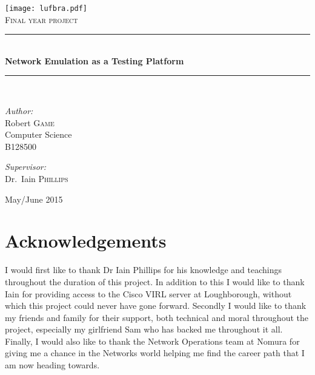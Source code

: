 \documentclass[11pt]{report}
\newcommand{\HRule}{\rule{\linewidth}{0.5mm}}
\begin{document}

\begin{titlepage}
	\begin{center}
		\texttt{[image: lufbra.pdf]}~\\[1cm]

		\textsc{\Large Final year project}\\[1.5cm]
		\HRule \\[0.4cm]
		{ \huge \bfseries Network Emulation as a Testing Platform \\[0.4cm] }
		
		\HRule \\[1.5cm]
		
		\noindent
		\begin{minipage}[t]{0.4\textwidth}
			\begin{flushleft} \large
				\emph{Author:}\\
				Robert \textsc{Game}\\
				Computer Science \\
				B128500
			\end{flushleft}
		\end{minipage}%
		\begin{minipage}[t]{0.4\textwidth}
			\begin{flushright} \large
				\emph{Supervisor:} \\
				Dr.~Iain \textsc{Phillips}
			\end{flushright}
		\end{minipage}
		
		\vfill
		
		{\large May/June 2015}
	\end{center}
\end{titlepage}


\chapter*{Acknowledgements}

I would first like to thank Dr Iain Phillips for his knowledge and teachings throughout the duration of this project. In addition to this I would like to thank Iain for providing access to the Cisco VIRL server at Loughborough, without which this project could never have gone forward. Secondly I would like to thank my friends and family for their support, both technical and moral throughout the project, especially my girlfriend Sam who has backed me throughout it all. Finally, I would also like to thank the Network Operations team at Nomura for giving me a chance in the Networks world helping me find the career path that I am now heading towards.  
\end{document}
